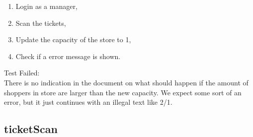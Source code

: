 \begin{itemize}
\begin{enumerate}
        \item Login as a manager,

        \item Scan the tickets,

        \item Update the capacity of the store to 1,

        \item Check if a error message is shown.
    \end{enumerate}
    Test Failed: \\
    There is no indication in the document on what should happen if the amount of shoppers in store are larger than the new capacity.
    We expect some sort of an error, but it just continues with an illegal text like 2/1.
\end{itemize}

\subsection{ticketScan}

